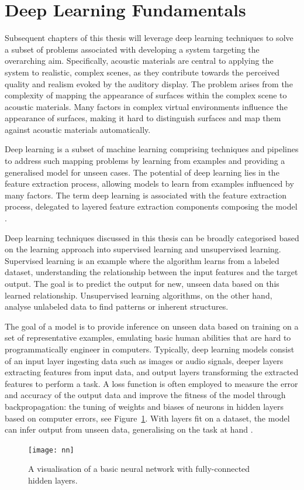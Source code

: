 \section{Deep Learning Fundamentals}
Subsequent chapters of this thesis will leverage deep learning techniques to solve a subset of problems associated with developing a system targeting the overarching aim. Specifically, acoustic materials are central to applying the system to realistic, complex scenes, as they contribute towards the perceived quality and realism evoked by the auditory display. The problem arises from the complexity of mapping the appearance of surfaces within the complex scene to acoustic materials. Many factors in complex virtual environments influence the appearance of surfaces, making it hard to distinguish surfaces and map them against acoustic materials automatically.\par
Deep learning is a subset of machine learning comprising techniques and pipelines to address such mapping problems by learning from examples and providing a generalised model for unseen cases. The potential of deep learning lies in the feature extraction process, allowing models to learn from examples influenced by many factors. The term deep learning is associated with the feature extraction process, delegated to layered feature extraction components composing the model \citep{dolhasz2021perceptually}.\par
Deep learning techniques discussed in this thesis can be broadly categorised based on the learning approach into supervised learning and unsupervised learning. Supervised learning is an example where the algorithm learns from a labeled dataset, understanding the relationship between the input features and the target output. The goal is to predict the output for new, unseen data based on this learned relationship. Unsupervised learning algorithms, on the other hand, analyse unlabeled data to find patterns or inherent structures.\par
The goal of a model is to provide inference on unseen data based on training on a set of representative examples, emulating basic human abilities that are hard to programmatically engineer in computers. Typically, deep learning models consist of an input layer ingesting data such as images or audio signals, deeper layers extracting features from input data, and output layers transforming the extracted features to perform a task. A loss function is often employed to measure the error and accuracy of the output data and improve the fitness of the model through backpropagation: the tuning of weights and biases of neurons in hidden layers based on computer errors, see Figure~\ref{fig:nn}. With layers fit on a dataset, the model can infer output from unseen data, generalising on the task at hand \citep{szeliski2022computer}.
\begin{figure}
    \centering
    \texttt{[image: nn]}
    \caption[Diagram of a fully-connected neural network]{A visualisation of a basic neural network with fully-connected hidden layers.}\label{fig:nn}
\end{figure}

